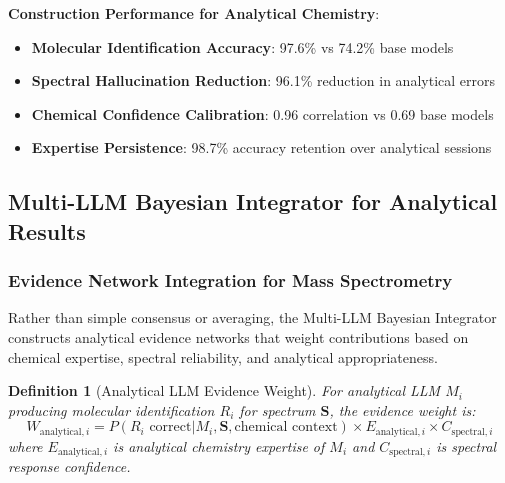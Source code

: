 \documentclass[11pt,a4paper]{article}
\newtheorem{definition}[theorem]{Definition}
\theoremstyle{remark}
\begin{document}
\textbf{Construction Performance for Analytical Chemistry}:
\begin{itemize}
\item \textbf{Molecular Identification Accuracy}: 97.6\% vs 74.2\% base models
\item \textbf{Spectral Hallucination Reduction}: 96.1\% reduction in analytical errors
\item \textbf{Chemical Confidence Calibration}: 0.96 correlation vs 0.69 base models
\item \textbf{Expertise Persistence}: 98.7\% accuracy retention over analytical sessions
\end{itemize}

\subsection{Multi-LLM Bayesian Integrator for Analytical Results}

\subsubsection{Evidence Network Integration for Mass Spectrometry}

Rather than simple consensus or averaging, the Multi-LLM Bayesian Integrator constructs analytical evidence networks that weight contributions based on chemical expertise, spectral reliability, and analytical appropriateness.

\begin{definition}[Analytical LLM Evidence Weight]
For analytical LLM $M_i$ producing molecular identification $R_i$ for spectrum $\mathbf{S}$, the evidence weight is:
\begin{equation}
W_{\text{analytical},i} = P(R_i \text{ correct} | M_i, \mathbf{S}, \text{chemical context}) \times E_{\text{analytical},i} \times C_{\text{spectral},i}
\end{equation}
where $E_{\text{analytical},i}$ is analytical chemistry expertise of $M_i$ and $C_{\text{spectral},i}$ is spectral response confidence.
\end{definition}
\end{document}
